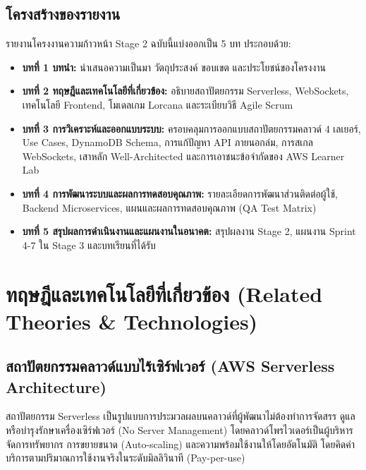 \documentclass[12pt,a4paper]{report}
\begin{document}
\section{โครงสร้างของรายงาน}
รายงานโครงงานความก้าวหน้า Stage 2 ฉบับนี้แบ่งออกเป็น 5 บท ประกอบด้วย:
\begin{itemize}
    \item \textbf{บทที่ 1 บทนำ:} นำเสนอความเป็นมา วัตถุประสงค์ ขอบเขต และประโยชน์ของโครงงาน
    \item \textbf{บทที่ 2 ทฤษฎีและเทคโนโลยีที่เกี่ยวข้อง:} อธิบายสถาปัตยกรรม Serverless, WebSockets, เทคโนโลยี Frontend, โมเดลเกม Lorcana และระเบียบวิธี Agile Scrum
    \item \textbf{บทที่ 3 การวิเคราะห์และออกแบบระบบ:} ครอบคลุมการออกแบบสถาปัตยกรรมคลาวด์ 4 เลเยอร์, Use Cases, DynamoDB Schema, การแก้ปัญหา API ภายนอกล่ม, การสเกล WebSockets, เสาหลัก Well-Architected และการเอาชนะข้อจำกัดของ AWS Learner Lab
    \item \textbf{บทที่ 4 การพัฒนาระบบและผลการทดสอบคุณภาพ:} รายละเอียดการพัฒนาส่วนติดต่อผู้ใช้, Backend Microservices, แผนและผลการทดสอบคุณภาพ (QA Test Matrix)
    \item \textbf{บทที่ 5 สรุปผลการดำเนินงานและแผนงานในอนาคต:} สรุปผลงาน Stage 2, แผนงาน Sprint 4-7 ใน Stage 3 และบทเรียนที่ได้รับ
\end{itemize}

\chapter{ทฤษฎีและเทคโนโลยีที่เกี่ยวข้อง (Related Theories \& Technologies)}

\section{สถาปัตยกรรมคลาวด์แบบไร้เซิร์ฟเวอร์ (AWS Serverless Architecture)}
สถาปัตยกรรม Serverless เป็นรูปแบบการประมวลผลบนคลาวด์ที่ผู้พัฒนาไม่ต้องทำการจัดสรร ดูแล หรือบำรุงรักษาเครื่องเซิร์ฟเวอร์ (No Server Management) โดยคลาวด์โพรไวเดอร์เป็นผู้บริหารจัดการทรัพยากร การขยายขนาด (Auto-scaling) และความพร้อมใช้งานให้โดยอัตโนมัติ โดยคิดค่าบริการตามปริมาณการใช้งานจริงในระดับมิลลิวินาที (Pay-per-use)
\end{document}
